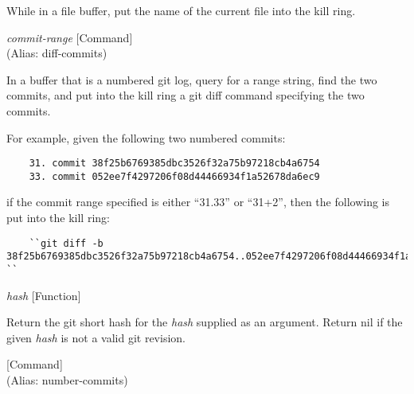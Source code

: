 \begin{doc-string}
While in a file buffer, put the name of the current file into the kill ring.
\end{doc-string}

\vspace{1em}
\noindent
{}
\usebox{\funcname}\emph{commit-range}
 \hfill [Command]\\%
 (Alias: diff-commits)

\begin{doc-string}
In a buffer that is a numbered git log, query for a range string, find the two
commits, and put into the kill ring a git diff command specifying the two commits.

For example, given the following two numbered commits:

\begin{verbatim}
    31. commit 38f25b6769385dbc3526f32a75b97218cb4a6754
    33. commit 052ee7f4297206f08d44466934f1a52678da6ec9
\end{verbatim}

if the commit range specified is either ``31.33'' or ``31+2'', then the following
is put into the kill ring:

\begin{verbatim}
    ``git diff -b 38f25b6769385dbc3526f32a75b97218cb4a6754..052ee7f4297206f08d44466934f1a52678da6ec9 ``
\end{verbatim}
\end{doc-string}

\vspace{1em}
\noindent
{}
\usebox{\funcname}\emph{hash}
 \hfill [Function]

\begin{doc-string}
Return the git short hash for the \emph{hash} supplied as an argument.  Return nil
if the given \emph{hash} is not a valid git revision.
\end{doc-string}

\vspace{1em}
\noindent
{}
\usebox{\funcname}
 \hfill [Command]\\%
 (Alias: number-commits)

